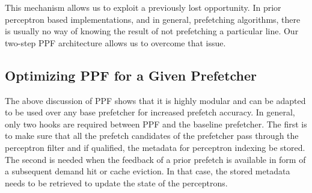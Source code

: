 This mechanism allows us to exploit a previously lost opportunity.  In prior
perceptron based implementations, and in general, prefetching algorithms,
there is usually no way of knowing the result of not prefetching a particular
line.  Our two-step PPF architecture allows us to overcome that issue.

\subsection{Optimizing PPF for a Given Prefetcher}
\label{Arch-Generalizing}
The above discussion of PPF shows that it is highly modular and can be adapted
to be used over any base prefetcher for increased prefetch accuracy.  In
general, only two hooks are required between PPF and the baseline prefetcher.
The first is to make sure that all the prefetch candidates of the prefetcher
pass through the perceptron filter and if qualified, the metadata for
perceptron indexing be stored. The second is needed when the feedback of a
prior prefetch is available in form of a subsequent demand hit or cache
eviction. In that case, the stored metadata needs to be retrieved to update
the state of the perceptrons.

